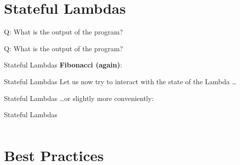 \section{Stateful Lambdas}

\begin{frame}[fragile]{Q: What is the output of the program?}
\end{frame}


\begin{frame}[fragile]{Q: What is the output of the program?}
\end{frame}


\begin{frame}[fragile]{Stateful Lambdas}
    \textbf{Fibonacci (again)}:
\end{frame}

\begin{frame}[fragile]{Stateful Lambdas}
    Let us now try to interact with the state of the Lambda \ldots
\end{frame}

\begin{frame}[fragile]{Stateful Lambdas}
    \ldots or slightly more conveniently:
\end{frame}

\begin{frame}[fragile]{Stateful Lambdas}
    \begin{columns}[t]
        \begin{column}{.6\textwidth}
        \end{column}
        \begin{column}{.35\textwidth}
        \end{column}
    \end{columns}
\end{frame}

\begin{frame}
    \centering
    \scalebox{3}{Best Practices}

\end{frame}

\section{Best Practices}

